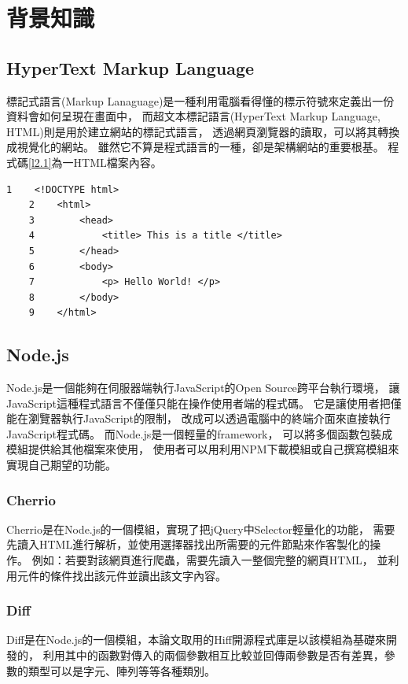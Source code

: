 \chapter{背景知識}

\section{HyperText Markup Language}\label{s2.1}
\indent
標記式語言(Markup Lanaguage)是一種利用電腦看得懂的標示符號來定義出一份資料會如何呈現在畫面中，
而超文本標記語言(HyperText Markup Language, HTML)則是用於建立網站的標記式語言\cite{HTML}\cite{HTML-book}，
透過網頁瀏覽器的讀取，可以將其轉換成視覺化的網站。
雖然它不算是程式語言的一種，卻是架構網站的重要根基。
程式碼\ref{l2.1}為一HTML檔案內容。

\begin{lstlisting}[caption=HTML範例檔案, label={l2.1}]
    1    <!DOCTYPE html> 
    2    <html>
    3        <head>
    4            <title> This is a title </title>
    5        </head>
    6        <body>
    7            <p> Hello World! </p>
    8        </body>
    9    </html>
\end{lstlisting}

\section{Node.js}\label{s2.2}
Node.js是一個能夠在伺服器端執行JavaScript的Open Source跨平台執行環境\cite{Node.js}\cite{Node.js-book}，
讓JavaScript這種程式語言不僅僅只能在操作使用者端的程式碼。
它是讓使用者把僅能在瀏覽器執行JavaScript的限制，
改成可以透過電腦中的終端介面來直接執行JavaScript程式碼。
而Node.js是一個輕量的framework，
可以將多個函數包裝成模組提供給其他檔案來使用，
使用者可以用利用NPM\cite{NPM}下載模組或自己撰寫模組來實現自己期望的功能。

\subsection{Cherrio}\label{s2.2.1}
Cherrio是在Node.js的一個模組，實現了把jQuery\cite{Jquery}中Selector輕量化的功能，
需要先讀入HTML進行解析，並使用選擇器找出所需要的元件節點來作客製化的操作。
例如：若要對該網頁進行爬蟲，需要先讀入一整個完整的網頁HTML，
並利用元件的條件找出該元件並讀出該文字內容。

\subsection{Diff}\label{s2.2.2}
Diff是在Node.js的一個模組，本論文取用的Hiff開源程式庫\cite{Hiff}是以該模組為基礎來開發的，
利用其中的函數對傳入的兩個參數相互比較並回傳兩參數是否有差異，參數的類型可以是字元、陣列等等各種類別。

